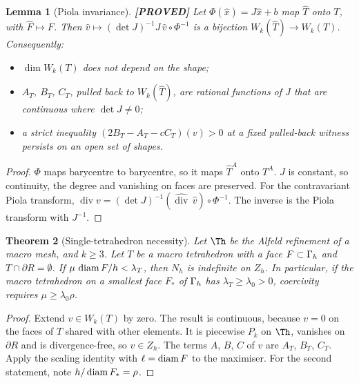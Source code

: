 \documentclass[11pt]{article}
\newtheorem{theorem}{Theorem}\newtheorem{lemma}[theorem]{Lemma}\newtheorem{corollary}[theorem]{Corollary}
\theoremstyle{remark}\newtheorem{remark}[theorem]{Remark}
\newcommand{\lab}[1]{\textbf{[#1]}}
\begin{document}
\begin{lemma}[Piola invariance]\label{lem:piola}\lab{PROVED}
Let $\Phi(\hat x)=J\hat x+b$ map $\hat T$ onto $T$, with $\hat F\mapsto F$. Then $\hat v\mapsto(\det J)^{-1}J\,\hat v\circ\Phi^{-1}$ is a bijection $W_k(\hat T)\to W_k(T)$. Consequently:
\begin{itemize}
\item $\dim W_k(T)$ does not depend on the shape;
\item $A_T$, $B_T$, $C_T$, pulled back to $W_k(\hat T)$, are rational functions of $J$ that are continuous where $\det J\neq0$;
\item a strict inequality $(2B_T-A_T-cC_T)(v)>0$ at a fixed pulled-back witness persists on an open set of shapes.
\end{itemize}
\end{lemma}
\begin{proof}
$\Phi$ maps barycentre to barycentre, so it maps $\hat T^A$ onto $T^A$. $J$ is constant, so continuity, the degree and vanishing on faces are preserved. For the contravariant Piola transform, $\operatorname{div}v=(\det J)^{-1}(\widehat{\operatorname{div}}\,\hat v)\circ\Phi^{-1}$. The inverse is the Piola transform with $J^{-1}$.
\end{proof}

\begin{theorem}[Single-tetrahedron necessity]\label{thm:3A}
Let $\Th$ be the Alfeld refinement of a macro mesh, and $k\ge3$. Let $T$ be a macro tetrahedron with a face $F\subset\Gamma_h$ and $T\cap\partial R=\emptyset$. If $\mu\,\operatorname{diam} F/h<\lambda_T$, then $N_h$ is indefinite on $Z_h$. In particular, if the macro tetrahedron on a smallest face $F_\ast$ of $\Gamma_h$ has $\lambda_{T}\ge\lambda_0>0$, coercivity requires $\mu\ge\lambda_0\rho$.
\end{theorem}
\begin{proof}
Extend $v\in W_k(T)$ by zero. The result is continuous, because $v=0$ on the faces of $T$ shared with other elements. It is piecewise $P_k$ on $\Th$, vanishes on $\partial R$ and is divergence-free, so $v\in Z_h$. The terms $A$, $B$, $C$ of $v$ are $A_T$, $B_T$, $C_T$. Apply the scaling identity with $\ell=\operatorname{diam} F$ to the maximiser. For the second statement, note $h/\operatorname{diam} F_\ast=\rho$.
\end{proof}
\end{document}
